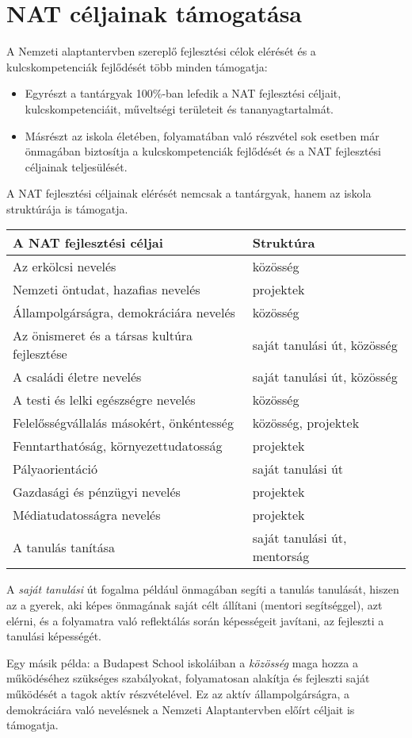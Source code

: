 \hypertarget{nat-celjainak-tamogatasa}{%
\section{NAT céljainak támogatása}\label{nat-celjainak-tamogatasa}}

A Nemzeti alaptantervben szereplő fejlesztési célok elérését és a
kulcskompetenciák fejlődését több minden támogatja:

\begin{itemize}
\item
  Egyrészt a tantárgyak 100\%-ban lefedik a NAT fejlesztési céljait,
  kulcskompetenciáit, műveltségi területeit és tananyagtartalmát.
\item
  Másrészt az iskola életében, folyamatában való részvétel sok esetben
  már önmagában
  biztosítja a kulcskompetenciák fejlődését és a NAT fejlesztési
  céljainak teljesülését.
\end{itemize}

A NAT fejlesztési céljainak elérését nemcsak a tantárgyak, hanem az
iskola struktúrája is támogatja.

\begin{longtable}[]{@{}ll@{}}
\toprule
\textbf{A NAT fejlesztési céljai} & \textbf{Struktúra}\tabularnewline
\midrule
\endhead
Az erkölcsi nevelés & közösség\tabularnewline
Nemzeti öntudat, hazafias nevelés & projektek\tabularnewline
Állampolgárságra, demokráciára nevelés & közösség\tabularnewline
Az önismeret és a társas kultúra fejlesztése & saját tanulási út,
közösség\tabularnewline
A családi életre nevelés & saját tanulási út, közösség\tabularnewline
A testi és lelki egészségre nevelés & közösség\tabularnewline
Felelősségvállalás másokért, önkéntesség & közösség,
projektek\tabularnewline
Fenntarthatóság, környezettudatosság & projektek\tabularnewline
Pályaorientáció & saját tanulási út\tabularnewline
Gazdasági és pénzügyi nevelés & projektek\tabularnewline
Médiatudatosságra nevelés & projektek\tabularnewline
A tanulás tanítása & saját tanulási út, mentorság\tabularnewline
\bottomrule
\end{longtable}

A \emph{saját tanulási} út fogalma például önmagában segíti a tanulás
tanulását, hiszen az a gyerek, aki képes önmagának saját célt állítani
(mentori segítséggel), azt elérni, és a folyamatra való reflektálás
során képességeit javítani, az fejleszti a tanulási képességét.

Egy másik példa: a Budapest School iskoláiban a \emph{közösség}
maga hozza a működéséhez szükséges szabályokat, folyamatosan alakítja és
fejleszti saját működését a tagok aktív részvételével. Ez az aktív
állampolgárságra, a demokráciára való nevelésnek a Nemzeti Alaptantervben
előírt céljait is támogatja.


